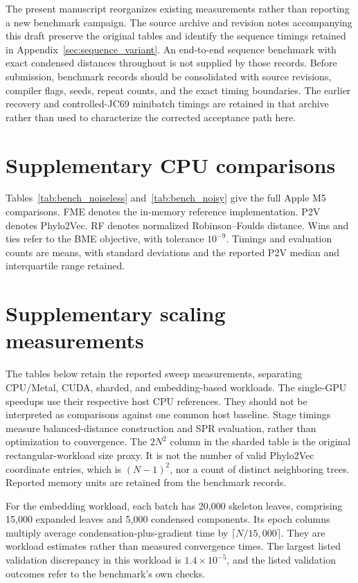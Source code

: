 The present manuscript reorganizes existing measurements rather than reporting a new benchmark campaign.
The source archive and revision notes accompanying this draft preserve the original tables and identify the sequence timings retained in Appendix~\ref{sec:sequence_variant}.
An end-to-end sequence benchmark with exact condensed distances throughout is not supplied by those records.
Before submission, benchmark records should be consolidated with source revisions, compiler flags, seeds, repeat counts, and the exact timing boundaries.
The earlier recovery and controlled-JC69 minibatch timings are retained in that archive rather than used to characterize the corrected acceptance path here.

\section{Supplementary CPU comparisons}
\label{sec:cpu_tables}

Tables~\ref{tab:bench_noiseless} and~\ref{tab:bench_noisy} give the full Apple M5 comparisons.
FME denotes the in-memory reference implementation.
P2V denotes Phylo2Vec.
RF denotes normalized Robinson--Foulds distance.
Wins and ties refer to the BME objective, with tolerance $10^{-9}$.
Timings and evaluation counts are means, with standard deviations and the reported P2V median and interquartile range retained.



\clearpage
\section{Supplementary scaling measurements}
\label{sec:scaling_tables}

The tables below retain the reported sweep measurements, separating CPU/Metal, CUDA, sharded, and embedding-based workloads.
The single-GPU speedups use their respective host CPU references.
They should not be interpreted as comparisons against one common host baseline.
Stage timings measure balanced-distance construction and SPR evaluation, rather than optimization to convergence.
The $2N^2$ column in the sharded table is the original rectangular-workload size proxy.
It is not the number of valid Phylo2Vec coordinate entries, which is $(N-1)^2$, nor a count of distinct neighboring trees.
Reported memory units are retained from the benchmark records.

For the embedding workload, each batch has 20,000 skeleton leaves, comprising 15,000 expanded leaves and 5,000 condensed components.
Its epoch columns multiply average condensation-plus-gradient time by
$\lceil N/15{,}000\rceil$.
They are workload estimates rather than measured convergence times.
The largest listed validation discrepancy in this workload is $1.4\times10^{-5}$, and the listed validation outcomes refer to the benchmark's own checks.


